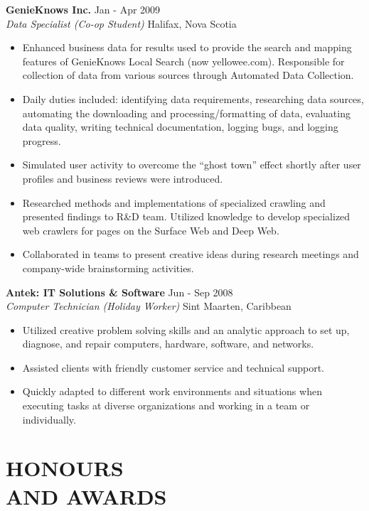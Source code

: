\documentclass[margin]{res}
\begin{document}
\begin{resume}
	\textbf{GenieKnows Inc.} \hfill Jan - Apr 2009 \\
    {\sl Data Specialist (Co-op Student)} \hfill Halifax, Nova Scotia
	\begin{itemize}  \itemsep -2pt %
	  \item Enhanced business data for results used to provide the search and mapping features of
	  GenieKnows Local Search (now yellowee.com).
	  Responsible for collection of data from various sources through Automated Data Collection.
	  \item Daily duties included: identifying data requirements,
	  researching data sources, automating the downloading and processing/formatting of data,
	  evaluating data quality, writing technical documentation, logging bugs, and logging progress.
	  \item Simulated user activity to overcome the ``ghost town'' effect shortly after user
	  profiles and business reviews were introduced. %
	  \item Researched methods and implementations of specialized crawling and presented findings
	  to R\&D team.
	  Utilized knowledge to develop specialized web crawlers for pages on the Surface Web and Deep Web.
	  \item Collaborated in teams to present creative ideas during research meetings and company-wide
	  brainstorming activities.
	\end{itemize}

	\textbf{Antek: IT Solutions \& Software} \hfill Jun - Sep 2008 \\
    {\sl Computer Technician (Holiday Worker)} \hfill Sint Maarten, Caribbean
	\begin{itemize}  \itemsep -2pt %
	  \item Utilized creative problem solving skills and an analytic approach to set up, diagnose,
	  and repair computers, hardware, software, and networks.
	  \item Assisted clients with friendly customer service and technical support.
	  \item Quickly adapted to different work environments and situations when executing tasks at
	  diverse organizations and working in a team or individually.
	\end{itemize}

\vfill

\section{HONOURS \\ AND AWARDS}


\end{resume}
\end{document}
